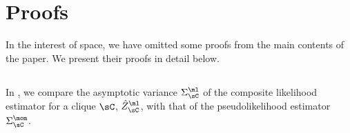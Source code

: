 \section{Proofs}
\label{app:proofs}

In the interest of space, we have omitted some proofs from
the main contents of the paper. We present their proofs in detail below.

%
%

\subsection{}
\label{app:pw-variance-proof}

In , we compare the asymptotic variance $\Sigma^\ml_\sC$ of the
composite likelihood estimator for a clique $\sC$, $\hat Z^\ml_\sC$, with
that of the pseudolikelihood estimator $\Sigma^\mom_\sC$.

